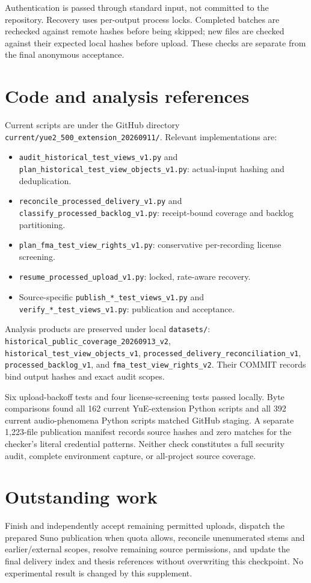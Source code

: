 \documentclass[11pt]{article}
\begin{document}
Authentication is passed through standard input, not committed to the
repository. Recovery uses per-output process locks. Completed batches are
rechecked against remote hashes before being skipped; new files are checked
against their expected local hashes before upload. These checks are separate
from the final anonymous acceptance.

\section{Code and analysis references}
Current scripts are under the GitHub directory
\nolinkurl{current/yue2_500_extension_20260911/}. Relevant implementations are:
\begin{itemize}
\item \nolinkurl{audit_historical_test_views_v1.py} and\newline
\nolinkurl{plan_historical_test_view_objects_v1.py}: actual-input hashing and deduplication.
\item \nolinkurl{reconcile_processed_delivery_v1.py} and
\nolinkurl{classify_processed_backlog_v1.py}: receipt-bound coverage and backlog partitioning.
\item \nolinkurl{plan_fma_test_view_rights_v1.py}: conservative per-recording license screening.
\item \nolinkurl{resume_processed_upload_v1.py}: locked, rate-aware recovery.
\item Source-specific \texttt{publish\_*\_test\_views\_v1.py} and
\texttt{verify\_*\_test\_views\_v1.py}: publication and acceptance.
\end{itemize}
Analysis products are preserved under local \texttt{datasets/}:
\nolinkurl{historical_public_coverage_20260913_v2},
\nolinkurl{historical_test_view_objects_v1},
\nolinkurl{processed_delivery_reconciliation_v1},
\nolinkurl{processed_backlog_v1}, and \nolinkurl{fma_test_view_rights_v2}.
Their COMMIT records bind output hashes and exact audit scopes.

Six upload-backoff tests and four license-screening tests passed locally.
Byte comparisons found all 162 current YuE-extension Python scripts and all
392 current audio-phenomena Python scripts matched GitHub staging. A separate
1,223-file publication manifest records source hashes and zero matches for
the checker's literal credential patterns. Neither check constitutes a full
security audit, complete environment capture, or all-project source coverage.

\section{Outstanding work}
Finish and independently accept remaining permitted uploads, dispatch the
prepared Suno publication when quota allows, reconcile unenumerated stems and
earlier/external scopes, resolve remaining source permissions, and update
the final delivery index and thesis references without overwriting this
checkpoint. No experimental result is changed by this supplement.
\end{document}
